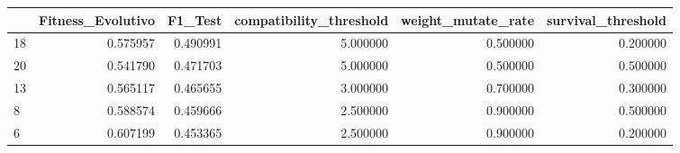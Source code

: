 \begin{tabular}{lrrrrr}
\toprule
 & Fitness_Evolutivo & F1_Test & compatibility_threshold & weight_mutate_rate & survival_threshold \\
\midrule
18 & 0.575957 & 0.490991 & 5.000000 & 0.500000 & 0.200000 \\
20 & 0.541790 & 0.471703 & 5.000000 & 0.500000 & 0.500000 \\
13 & 0.565117 & 0.465655 & 3.000000 & 0.700000 & 0.300000 \\
8 & 0.588574 & 0.459666 & 2.500000 & 0.900000 & 0.500000 \\
6 & 0.607199 & 0.453365 & 2.500000 & 0.900000 & 0.200000 \\
\bottomrule
\end{tabular}
